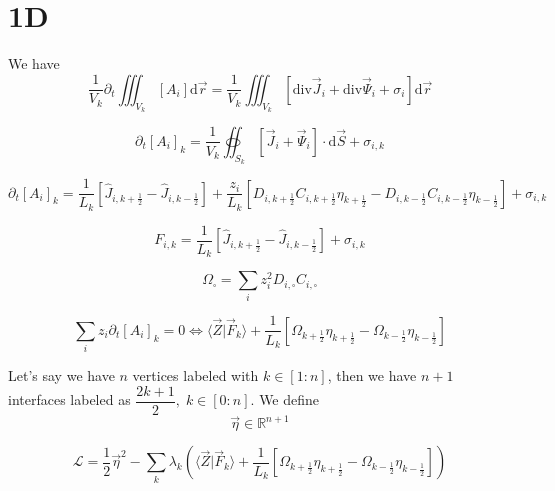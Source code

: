 \documentclass[aps,12pt]{revtex4}
\newcommand{\half}{\frac{1}{2}}
\begin{document}
\section{1D}

We have 
\begin{equation}
	\dfrac{1}{V_k} \partial_t \iiint_{V_k} [A_i] \mathrm d\vec r = \dfrac{1}{V_k} \iiint_{V_k} \left[ \mathrm{div} \vec J_i + \mathrm{div} \vec \Psi _i + \sigma_i \right] \mathrm d \vec r
\end{equation}

\begin{equation}
	\partial_t [A_i]_k = \dfrac{1}{V_k}\oiint_{S_k}  \left[ \vec J_i + \vec \Psi_i \right] \cdot \mathrm d \vec S + \sigma_{i,k}
\end{equation}


\begin{equation}
	\partial_t  [A_i]_k = \dfrac{1}{L_k} \left[ \hat J_{i,k+\half} - \hat J_{i,k-\half} \right] 
	+ \dfrac{z_i}{L_k}\left[ D_{i,k+\half} C_{i,k+\half} \eta_{k+\half} -  D_{i,k-\half} C_{i,k-\half} \eta_{k-\half}\right]+ \sigma_{i,k}
\end{equation}

\begin{equation}
	F_{i,k} =  \dfrac{1}{L_k} \left[ \hat J_{i,k+\half} - \hat J_{i,k-\half} \right]  + \sigma_{i,k}
\end{equation}

\begin{equation}
	\Omega_{\square} = \sum_i z_i^2 D_{i,\square} C_{i,\square}
\end{equation}

\begin{equation}
	\sum_i z_i \partial_t [A_i]_k = 0 \iff \langle \vec Z \vert \vec F_k \rangle
	 + \dfrac{1}{L_k}\left[\Omega_{k+\half} \eta_{k+\half} - \Omega_{k-\half} \eta_{k-\half}\right]
\end{equation}

Let's say we have $n$ vertices labeled with $k\in[1:n]$, then we have $n+1$ interfaces labeled as $\dfrac{2k+1}{2},\;k\in[0:n]$.
We define
\begin{equation}
	\vec \eta \in \mathbb R ^ {n+1}
\end{equation}

\begin{equation}
	\mathcal L = \dfrac{1}{2} \vec \eta ^2 - \sum_k \lambda_k \left(\langle \vec Z \vert \vec F_k \rangle
	 + \dfrac{1}{L_k}\left[\Omega_{k+\half} \eta_{k+\half} - \Omega_{k-\half} \eta_{k-\half}\right]\right)
\end{equation}
\end{document}
